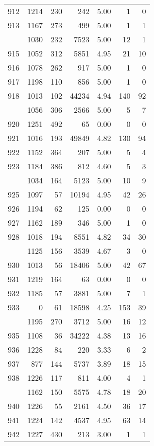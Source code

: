 \documentclass[
]{article}
\begin{document}
\begin{table}
\begin{tabular}[t]{lrrrrrr}
912 & 1214 & 230 & 242 & 5.00 & 1 & 0\\
913 & 1167 & 273 & 499 & 5.00 & 1 & 1\\
\addlinespace
914 & 1030 & 232 & 7523 & 5.00 & 12 & 1\\
915 & 1052 & 312 & 5851 & 4.95 & 21 & 10\\
916 & 1078 & 262 & 917 & 5.00 & 1 & 0\\
917 & 1198 & 110 & 856 & 5.00 & 1 & 0\\
918 & 1013 & 102 & 44234 & 4.94 & 140 & 92\\
\addlinespace
919 & 1056 & 306 & 2566 & 5.00 & 5 & 7\\
920 & 1251 & 492 & 65 & 0.00 & 0 & 0\\
921 & 1016 & 193 & 49849 & 4.82 & 130 & 94\\
922 & 1152 & 364 & 207 & 5.00 & 5 & 4\\
923 & 1184 & 386 & 812 & 4.60 & 5 & 3\\
\addlinespace
924 & 1034 & 164 & 5123 & 5.00 & 10 & 9\\
925 & 1097 & 57 & 10194 & 4.95 & 42 & 26\\
926 & 1194 & 62 & 125 & 0.00 & 0 & 0\\
927 & 1162 & 189 & 346 & 5.00 & 1 & 0\\
928 & 1018 & 194 & 8551 & 4.82 & 34 & 30\\
\addlinespace
929 & 1125 & 156 & 3539 & 4.67 & 3 & 0\\
930 & 1013 & 56 & 18406 & 5.00 & 42 & 67\\
931 & 1219 & 164 & 63 & 0.00 & 0 & 0\\
932 & 1185 & 57 & 3881 & 5.00 & 7 & 1\\
933 & 0 & 61 & 18598 & 4.25 & 153 & 39\\
\addlinespace
934 & 1195 & 270 & 3712 & 5.00 & 16 & 12\\
935 & 1108 & 36 & 34222 & 4.38 & 13 & 16\\
936 & 1228 & 84 & 220 & 3.33 & 6 & 2\\
937 & 877 & 144 & 5737 & 3.89 & 18 & 15\\
938 & 1226 & 117 & 811 & 4.00 & 4 & 1\\
\addlinespace
939 & 1162 & 150 & 5575 & 4.78 & 18 & 20\\
940 & 1226 & 55 & 2161 & 4.50 & 36 & 17\\
941 & 1224 & 142 & 4537 & 4.95 & 63 & 14\\
942 & 1227 & 430 & 213 & 3.00 & 1 & 1\\

\end{tabular}
\end{table}
\end{document}
